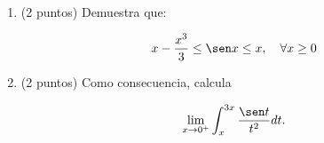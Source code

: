 \documentclass[12pt]{article}
\begin{document}
    \begin{ejercicio}[4 puntos]\

        \begin{enumerate}
            \item (2 puntos) Demuestra que:

            \begin{gather*}
                x - \frac{x^3}{3} \leq \sen x \leq x, \ \ \ \forall x \geq 0
            \end{gather*}

            \item (2 puntos) Como consecuencia, calcula
            
            \begin{gather*}
                \lim_{x \to 0^+} \int_{x}^{3x} \frac{\sen t}{t^2} dt.
            \end{gather*}
        \end{enumerate}
        
    \end{ejercicio}
\end{document}
